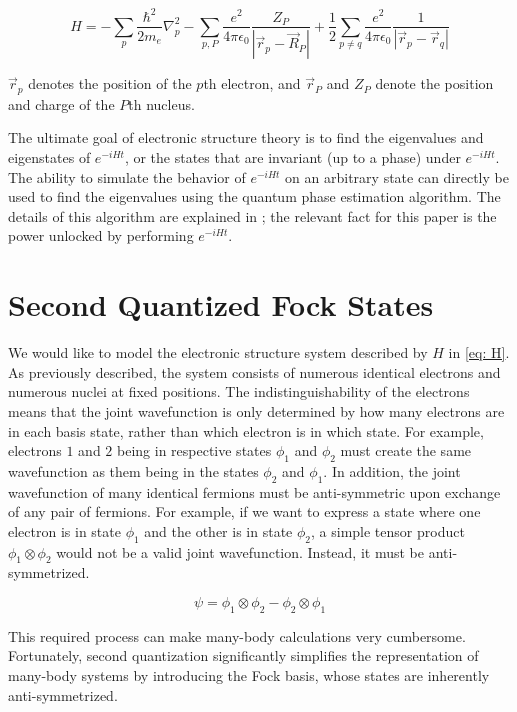 \begin{equation}
    H = -\sum_p \frac{\hbar^2}{2m_e} \nabla^2_p - \sum_{p, P}\frac{e^2}{4\pi\epsilon_0}\frac{Z_P}{|\vec{r}_p - \vec{R}_P|} + \frac{1}{2}\sum_{p \neq q}\frac{e^2}{4\pi\epsilon_0}\frac{1}{|\vec{r}_p - \vec{r}_q|} \label{eq: H}
\end{equation}

$\vec{r}_p$ denotes the position of the $p$th electron, and $\vec{r}_P$ and $Z_P$ denote the position and charge of the $P$th nucleus.

The ultimate goal of electronic structure theory is to find the eigenvalues and eigenstates of $e^{-iHt}$, or the states that are invariant (up to a phase) under $e^{-iHt}$. The ability to simulate the behavior of $e^{-iHt}$ on an arbitrary state can directly be used to find the eigenvalues using the quantum phase estimation algorithm. The details of this algorithm are explained in \cite{MikeIke}; the relevant fact for this paper is the power unlocked by performing $e^{-iHt}$.

\section{Second Quantized Fock States}

We would like to model the electronic structure system described by $H$ in \eqref{eq: H}. As previously described, the system consists of numerous identical electrons and numerous nuclei at fixed positions. The indistinguishability of the electrons means that the joint wavefunction is only determined by how many electrons are in each basis state, rather than which electron is in which state. For example, electrons $1$ and $2$ being in respective states $\phi_1$ and $\phi_2$ must create the same wavefunction as them being in the states $\phi_2$ and $\phi_1$. In addition, the joint wavefunction of many identical fermions must be anti-symmetric upon exchange of any pair of fermions. For example, if we want to express a state where one electron is in state $\phi_1$ and the other is in state $\phi_2$, a simple tensor product $\phi_1 \otimes \phi_2$ would not be a valid joint wavefunction. Instead, it must be anti-symmetrized.

\begin{equation}
    \psi = \phi_1 \otimes \phi_2 - \phi_2 \otimes \phi_1
\end{equation}

This required process can make many-body calculations very cumbersome. Fortunately, second quantization significantly simplifies the representation of many-body systems by introducing the Fock basis, whose states are inherently anti-symmetrized.

